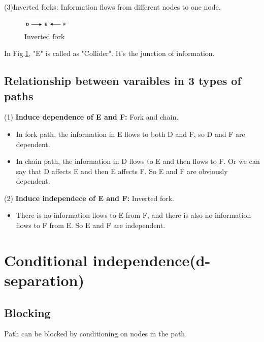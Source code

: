(3)Inverted forks: Information flows from different nodes to one node. 
	\begin{figure}[htbp]
	\setlength{\abovecaptionskip}{0pt}     %
	\setlength{\belowcaptionskip}{10pt}
	\vspace{-0cm}  %
	\setlength{\abovecaptionskip}{-0cm}   %
	\setlength{\belowcaptionskip}{-0cm}   %
	\centering
	\includegraphics[width=0.2\textwidth]{figure/invfork.png}
	\caption{Inverted fork}
	\label{invfork}
    \end{figure}
In Fig.\ref{invfork}, "E" is called as "Collider". It's the junction of information.

\subsection{Relationship between varaibles in 3 types of paths}
(1) {\bfseries Induce dependence of E and F:} Fork and chain. 
\begin{itemize}
	\item In fork path, the information in E flows to both D and F, so D and F are dependent.  
	\item In chain path, the information in D flows to E and then flows to F. Or we can say that D affects E and then E affects F. So E and F are obviously dependent. {}
\end{itemize}

(2) {\bfseries Induce independece of E and F:} Inverted fork. 
\begin{itemize}
	\item There is no information flows to E from F, and there is also no information flows to F from E. So E and F are independent.
\end{itemize}

\section{Conditional independence(d-separation)}
\subsection{Blocking}
Path can be blocked by conditioning on nodes in the path.

